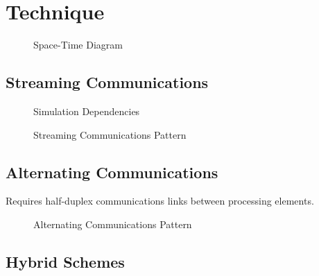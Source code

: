 \section{Technique}

\begin{figure}
  \centering
  
  \caption{Space-Time Diagram}
  \label{fig:lightcone}
\end{figure}


\subsection{Streaming Communications}
\begin{figure}
  \centering
  
  \caption{Simulation Dependencies}
  \label{fig:simcone}
\end{figure}

\begin{figure}
  \centering
  
  \caption{Streaming Communications Pattern}
  \label{fig:streamingcomms}
\end{figure}


\subsection{Alternating Communications}

Requires half-duplex communications links between processing elements.
\begin{figure}
  \centering
  
  \caption{Alternating Communications Pattern}
  \label{fig:alternatingcomms}
\end{figure}


\subsection{Hybrid Schemes}


